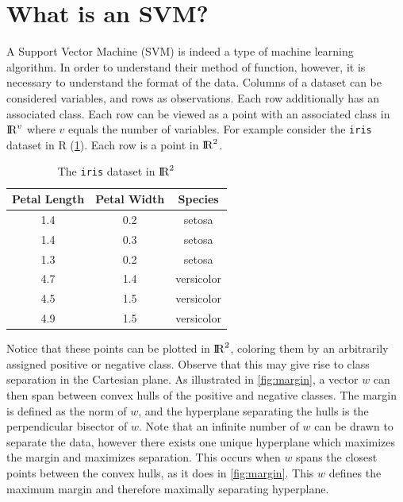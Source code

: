 \documentclass[11pt]{article}
\theoremstyle{remark}	  \newtheorem*{remark}{Remark}
\numberwithin{equation}{section}
\begin{document}
\section{What is an SVM?}

A Support Vector Machine (SVM) is indeed a type of machine learning algorithm. In order to understand their method of function, however, it is necessary to understand the format of the data. Columns of a dataset can be considered variables, and rows as observations. Each row additionally has an associated class. Each row can be viewed as a point with an associated class in ${\rm I\!R}^{v}$ where $v$ equals the number of variables. For example consider the \texttt{iris} dataset in R (\ref{table:iris}). Each row is a point in ${\rm I\!R}^{2}$.

\begin{table}[h]
\centering
\begin{tabular}{c c | c}
Petal Length  & Petal Width & Species \\
\hline
1.4 & 0.2 & setosa  \\
1.4 & 0.3 & setosa  \\
1.3 & 0.2 & setosa  \\
4.7 & 1.4 & versicolor \\
4.5 & 1.5 & versicolor \\
4.9 & 1.5 & versicolor  \\
\end{tabular}
\caption{The \texttt{iris} dataset in ${\rm I\!R}^{2}$}
\label{table:iris}
\end{table}

Notice that these points can be plotted in ${\rm I\!R}^{2}$, coloring them by an arbitrarily assigned positive or negative class. Observe that this may give rise to class separation in the Cartesian plane. As illustrated in \ref{fig:margin}, a vector $w$ can then span between convex hulls of the positive and negative classes. The margin is defined as the norm of $w$, and the hyperplane separating the hulls is the perpendicular bisector of $w$. Note that an infinite number of $w$ can be drawn to separate the data, however there exists one unique hyperplane which maximizes the margin and maximizes separation. This occurs when $w$ spans the closest points between the convex hulls, as it does in \ref{fig:margin}. This $w$ defines the maximum margin and therefore maximally separating hyperplane.
\end{document}

